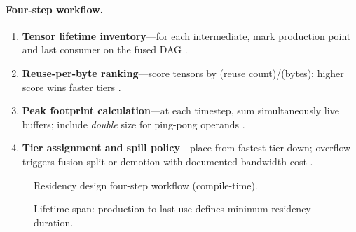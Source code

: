 \paragraph{Four-step workflow.}
\begin{enumerate}
\item \textbf{Tensor lifetime inventory}---for each intermediate, mark production point and last consumer on the fused DAG \citep{rotem2018glow,wu2024mirage}.
\item \textbf{Reuse-per-byte ranking}---score tensors by (reuse count)/(bytes); higher score wins faster tiers \citep{dao2022flashattention,dlbook}.
\item \textbf{Peak footprint calculation}---at each timestep, sum simultaneously live buffers; include \emph{double} size for ping-pong operands \citep{semianalysis2024tma,dao2022flashattention}.
\item \textbf{Tier assignment and spill policy}---place from fastest tier down; overflow triggers fusion split or demotion with documented bandwidth cost \citep{yirage2026,chen2020compilerbasedhardw}.
\end{enumerate}

\begin{figure}[t]
\centering
{}
\caption{Residency design four-step workflow (compile-time).}
\label{fig:ch06_residency_workflow}
\end{figure}

\begin{figure}[t]
\centering
{}
\caption{Lifetime span: production to last use defines minimum residency duration.}
\label{fig:lifetime_planning_pipeline}
\end{figure}

